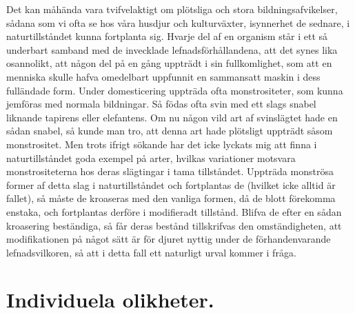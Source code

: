 Det kan måhända vara tvifvelaktigt om plötsliga och stora bildningsafvikelser, sådana som vi ofta se hos våra husdjur och kulturväxter, isynnerhet de sednare, i naturtillståndet kunna fortplanta sig. Hvarje del af en organism står i ett så underbart samband med de invecklade lefnadsförhållandena, att det synes lika osannolikt, att någon del på en gång uppträdt i sin fullkomlighet, som att en menniska skulle hafva omedelbart uppfunnit en sammansatt maskin i dess fulländade form. Under domesticering uppträda ofta monstrositeter, som kunna jemföras med normala bildningar. Så födas ofta svin med ett slags snabel liknande tapirens eller elefantens. Om nu någon vild art af svinslägtet hade en sådan snabel, så kunde man tro, att denna art hade plötsligt uppträdt såsom monstrositet. Men trots ifrigt sökande har det icke lyckats mig att finna i naturtillståndet goda exempel på arter, hvilkas variationer motsvara monstrositeterna hos deras slägtingar i tama tillståndet. Uppträda monströsa former af detta slag i naturtillståndet och fortplantas de (hvilket icke alltid är fallet), så måste de kroaseras med den vanliga formen, då de blott förekomma enstaka, och fortplantas derföre i modifieradt tillstånd. Blifva de efter en sådan kroasering beständiga, så får deras bestånd tillskrifvas den omständigheten, att modifikationen på något sätt är för djuret nyttig under de förhandenvarande lefnadsvilkoren, så att i detta fall ett naturligt urval kommer i fråga.



\section{Individuela olikheter.}

